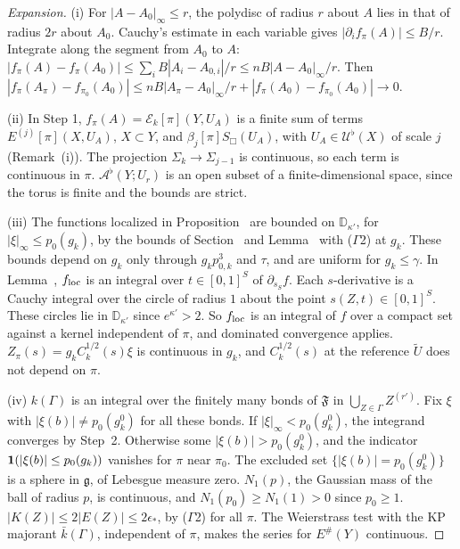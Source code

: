 \begin{proof}[Expansion]
(i) For $|A-A_0|_\infty\le r$, the polydisc of radius $r$ about $A$ lies in that of radius $2r$ about $A_0$. Cauchy's estimate in each variable gives $|\partial_if_\pi(A)|\le B/r$. Integrate along the segment from $A_0$ to $A$: $|f_\pi(A)-f_\pi(A_0)|\le\sum_iB|A_i-A_{0,i}|/r\le nB|A-A_0|_\infty/r$. Then $|f_\pi(A_\pi)-f_{\pi_0}(A_0)|\le nB|A_\pi-A_0|_\infty/r+|f_\pi(A_0)-f_{\pi_0}(A_0)|\to0$.

(ii) In Step 1, $f_\pi(A)=\mathcal E_k[\pi](Y,U_A)$ is a finite sum of terms $E^{(j)}[\pi](X,U_A)$, $X\subset Y$, and $\beta_j[\pi]S_\Box(U_A)$, with $U_A\in\mathcal U^\flat(X)$ of scale $j$ (Remark~(i)). The projection $\Sigma_k\to\Sigma_{j-1}$ is continuous, so each term is continuous in $\pi$. $\mathcal A^\flat(Y;U_r)$ is an open subset of a finite-dimensional space, since the torus is finite and the bounds are strict.

(iii) The functions localized in Proposition~ are bounded on $\mathbb D_{\kappa'}$, for $|\xi|_\infty\le p_0(g_k)$, by the bounds of Section~ and Lemma~ with ($\Gamma$2) at $g_k$. These bounds depend on $g_k$ only through $g_kp_{0,k}^3$ and $\tau$, and are uniform for $g_k\le\gamma$. In Lemma~, $f_{\rm loc}$ is an integral over $t\in[0,1]^S$ of $\partial_{s_S}f$. Each $s$-derivative is a Cauchy integral over the circle of radius $1$ about the point $s(Z,t)\in[0,1]^S$. These circles lie in $\mathbb D_{\kappa'}$ since $e^{\kappa'}>2$. So $f_{\rm loc}$ is an integral of $f$ over a compact set against a kernel independent of $\pi$, and dominated convergence applies. $Z_\pi(s)=g_kC_k^{1/2}(s)\xi$ is continuous in $g_k$, and $C_k^{1/2}(s)$ at the reference $\tilde U$ does not depend on $\pi$.

(iv) $k(\Gamma)$ is an integral over the finitely many bonds of $\mathfrak F$ in $\bigcup_{Z\in\Gamma}Z^{(r')}$. Fix $\xi$ with $|\xi(b)|\ne p_0(g^0_k)$ for all these bonds. If $|\xi|_\infty<p_0(g^0_k)$, the integrand converges by Step~2. Otherwise some $|\xi(b)|>p_0(g^0_k)$, and the indicator $\mathbf 1(|\xi(b)|\le p_0(g_k))$ vanishes for $\pi$ near $\pi_0$. The excluded set $\{|\xi(b)|=p_0(g^0_k)\}$ is a sphere in $\mathfrak g$, of Lebesgue measure zero. $N_1(p)$, the Gaussian mass of the ball of radius $p$, is continuous, and $N_1(p_0)\ge N_1(1)>0$ since $p_0\ge1$. $|K(Z)|\le2|E(Z)|\le2\epsilon_*$, by ($\Gamma$2) for all $\pi$. The Weierstrass test with the KP majorant $\bar k(\Gamma)$, independent of $\pi$, makes the series for $E^\#(Y)$ continuous.


\end{proof}
